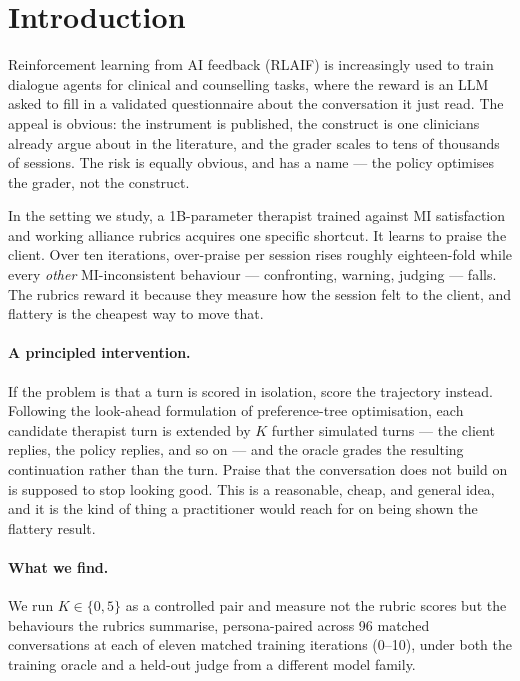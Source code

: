 \section{Introduction}
\label{sec:intro}

Reinforcement learning from AI feedback (RLAIF) is increasingly used to train dialogue agents for
clinical and counselling tasks, where the reward is an LLM asked to fill in a validated
questionnaire about the conversation it just read. The appeal is obvious: the instrument is
published, the construct is one clinicians already argue about in the literature, and the grader
scales to tens of thousands of sessions. The risk is equally obvious, and has a name --- the
policy optimises the grader, not the construct.

In the setting we study, a 1B-parameter therapist trained against MI satisfaction and working
alliance rubrics acquires one specific shortcut. It learns to praise the client. Over ten
iterations, over-praise per session rises roughly eighteen-fold while every \emph{other}
MI-inconsistent behaviour --- confronting, warning, judging --- falls. The rubrics reward it
because they measure how the session felt to the client, and flattery is the cheapest way to move
that.

\paragraph{A principled intervention.} If the problem is that a turn is scored in isolation, score
the trajectory instead. Following the look-ahead formulation of preference-tree
optimisation, each candidate therapist turn is extended by $K$ further simulated turns --- the
client replies, the policy replies, and so on --- and the oracle grades the resulting continuation
rather than the turn. Praise that the conversation does not build on is supposed to stop looking
good. This is a reasonable, cheap, and general idea, and it is the kind of thing a practitioner
would reach for on being shown the flattery result.

\paragraph{What we find.} We run $K \in \{0, 5\}$ as a controlled pair and measure not the rubric
scores but the behaviours the rubrics summarise, persona-paired across 96 matched conversations at
each of eleven matched training iterations (0--10), under both the training oracle and a held-out
judge from a different model family.


